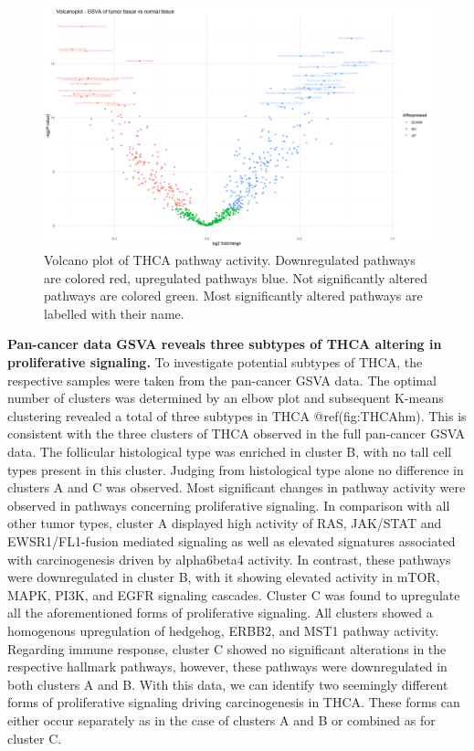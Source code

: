 \documentclass[
]{article}
\begin{document}
\begin{figure}

{\centering \includegraphics[width=1\linewidth]{figures/Volcanoplot THCA GSVA data} 

}

\caption{Volcano plot of THCA pathway activity. Downregulated pathways are colored red, upregulated pathways blue. Not significantly altered pathways are colored green. Most significantly altered pathways are labelled with their name.}\label{fig:THCAvolcano}
\end{figure}

\textbf{Pan-cancer data GSVA reveals three subtypes of THCA altering in
proliferative signaling.} To investigate potential subtypes of THCA, the
respective samples were taken from the pan-cancer GSVA data. The optimal
number of clusters was determined by an elbow plot and subsequent
K-means clustering revealed a total of three subtypes in THCA
@ref(fig:THCAhm). This is consistent with the three clusters of THCA
observed in the full pan-cancer GSVA data. The follicular histological
type was enriched in cluster B, with no tall cell types present in this
cluster. Judging from histological type alone no difference in clusters
A and C was observed. Most significant changes in pathway activity were
observed in pathways concerning proliferative signaling. In comparison
with all other tumor types, cluster A displayed high activity of RAS,
JAK/STAT and EWSR1/FL1-fusion mediated signaling as well as elevated
signatures associated with carcinogenesis driven by alpha6beta4
activity. In contrast, these pathways were downregulated in cluster B,
with it showing elevated activity in mTOR, MAPK, PI3K, and EGFR
signaling cascades. Cluster C was found to upregulate all the
aforementioned forms of proliferative signaling. All clusters showed a
homogenous upregulation of hedgehog, ERBB2, and MST1 pathway activity.
Regarding immune response, cluster C showed no significant alterations
in the respective hallmark pathways, however, these pathways were
downregulated in both clusters A and B. With this data, we can identify
two seemingly different forms of proliferative signaling driving
carcinogenesis in THCA. These forms can either occur separately as in
the case of clusters A and B or combined as for cluster C.
\end{document}
